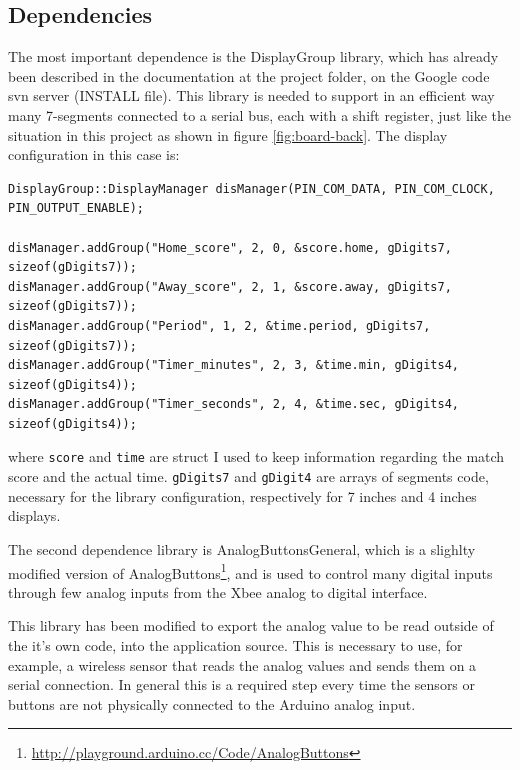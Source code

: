 \documentclass[11pt,english]{article}
\newcommand{\code}[1]{\texttt{#1}}
\begin{document}
\subsection{Dependencies}\label{subsec:dep}

The most important dependence is the DisplayGroup library, which has already been described in the 
documentation at the project folder, on the Google code svn server (INSTALL file). This library is needed 
to support in an efficient way many 7-segments connected to a serial bus, each with a shift register, 
just like the situation in this project as shown in figure \ref{fig:board-back}.
The display configuration in this case is:

%
\begin{lstlisting}[label=lis:dis-config,caption=DisplayGroup configuration]
DisplayGroup::DisplayManager disManager(PIN_COM_DATA, PIN_COM_CLOCK, PIN_OUTPUT_ENABLE);

disManager.addGroup("Home_score", 2, 0, &score.home, gDigits7, sizeof(gDigits7));
disManager.addGroup("Away_score", 2, 1, &score.away, gDigits7, sizeof(gDigits7));
disManager.addGroup("Period", 1, 2, &time.period, gDigits7, sizeof(gDigits7));
disManager.addGroup("Timer_minutes", 2, 3, &time.min, gDigits4, sizeof(gDigits4));
disManager.addGroup("Timer_seconds", 2, 4, &time.sec, gDigits4, sizeof(gDigits4));
\end{lstlisting}

where \code{score} and \code{time} are struct I used to keep information regarding the match score and the 
actual time. \code{gDigits7} and \code{gDigit4} are arrays of segments code, necessary for the library 
configuration, respectively for 7 inches and 4 inches displays. 

The second dependence library is AnalogButtonsGeneral, which is a slighlty modified version of AnalogButtons\footnote{\url{http://playground.arduino.cc/Code/AnalogButtons}},
and is used to control many digital inputs through few analog inputs from the Xbee analog to digital interface. 

This library has been modified to export the analog value to be read outside of the it's own code, into the application source. 
This is necessary to use, for example, a wireless sensor that reads the analog values and sends them on a serial connection. 
In general this is a required step every time the sensors or buttons are not physically connected to the Arduino analog input.
\end{document}
